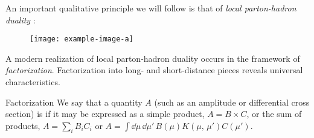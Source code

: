 An important qualitative principle we will follow is that of \textit{local parton-hadron duality} \cite{}:
%







\begin{figure}[t!]
    \centering
    \texttt{[image: example-image-a]}

    \caption[]{
    }

    \label{fig:factorization}
\end{figure}






A modern realization of local parton-hadron duality occurs in the framework of \textit{factorization}.
%
Factorization into long- and short-distance pieces reveals universal characteristics.
\begin{definitionbox}{Factorization}{}
    We say that a quantity \(A\) (such as an amplitude or differential cross section) is  if it may be expressed as a simple product, \(A = B \times C\), or the sum of products, \(A = \sum_i B_i C_i\) or \(A = \int \dd \mu\,\dd\mu'\, B(\mu) K(\mu,\,\mu') C(\mu')\).
\end{definitionbox}



